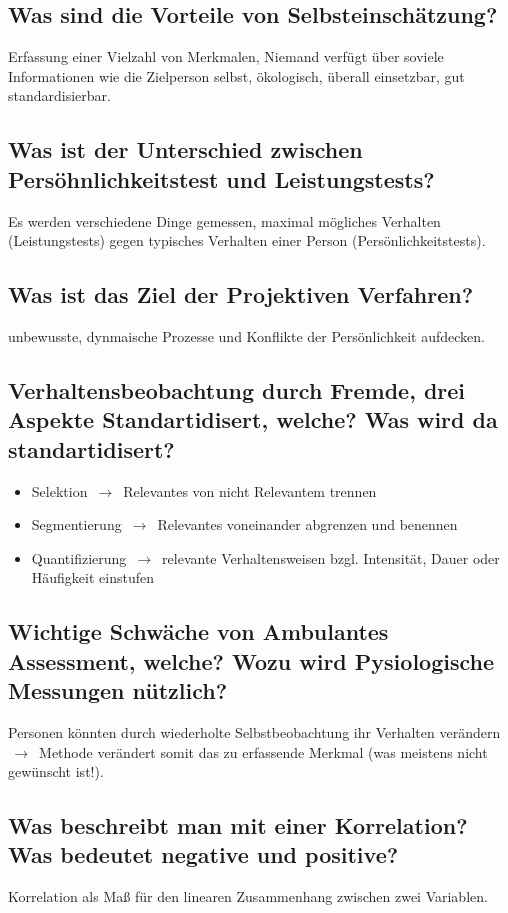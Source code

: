 \documentclass[a6paper,10pt,DIV=40]{scrartcl}
\begin{document}
\subsection{Was sind die Vorteile von Selbsteinschätzung?}
Erfassung einer Vielzahl von Merkmalen, Niemand verfügt über soviele Informationen wie die Zielperson selbst, ökologisch, überall einsetzbar, gut standardisierbar.
\subsection{Was ist der Unterschied zwischen Persöhnlichkeitstest und Leistungstests?}
Es werden verschiedene Dinge gemessen, maximal mögliches Verhalten (Leistungstests) gegen typisches Verhalten einer Person (Persönlichkeitstests).
\subsection{Was ist das Ziel der Projektiven Verfahren?}
unbewusste, dynmaische Prozesse und Konflikte der Persönlichkeit aufdecken.
\subsection{Verhaltensbeobachtung durch Fremde, drei Aspekte Standartidisert, welche? Was wird da standartidisert?}
\begin{itemize}
\item Selektion $\,\to\,$ Relevantes von nicht Relevantem trennen
\item Segmentierung $\,\to\,$ Relevantes voneinander abgrenzen und benennen
\item Quantifizierung $\,\to\,$ relevante Verhaltensweisen bzgl. Intensität, Dauer oder Häufigkeit einstufen
\end{itemize}
\subsection{Wichtige Schwäche von Ambulantes Assessment, welche? Wozu wird Pysiologische Messungen nützlich?}
Personen könnten durch wiederholte Selbstbeobachtung ihr Verhalten verändern $\,\to\,$ Methode verändert somit das zu erfassende Merkmal (was meistens nicht gewünscht ist!).
\subsection{Was beschreibt man mit einer Korrelation? Was bedeutet negative und positive?}
Korrelation als Maß für den linearen Zusammenhang zwischen zwei Variablen.\\
\end{document}
